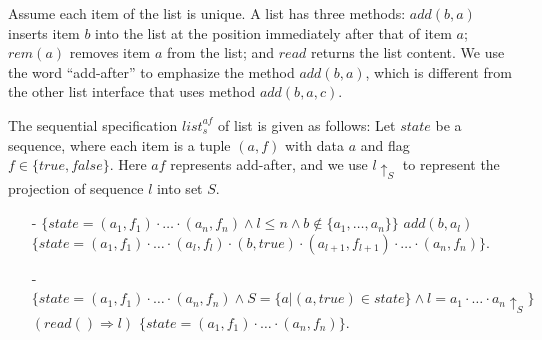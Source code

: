 \begin{example}
\label{definition:sequential specification of list with add-after interface}
Assume each item of the list is unique. A list has three methods: $\mathit{add}(b,a)$ inserts item $b$ into the list at the position immediately after that of item $a$; $\mathit{rem}(a)$ removes item $a$ from the list; and $\mathit{read}$ returns the list content. We use the word ``add-after'' to emphasize the method $\mathit{add}(b,a)$, which is different from the other list interface that uses method $\mathit{add}(b,a,c)$.

The sequential specification $\mathit{list}_s^{\mathit{af}}$ of list is given as follows: Let $\mathit{state}$ be a sequence, where each item is a tuple $(a,f)$ with data $a$ and flag $f \in \{ \mathit{true},\mathit{false} \}$. Here $\mathit{af}$ represents add-after, and we use $l \uparrow_{S}$ to represent the projection of sequence $l$ into set $S$.
\begin{itemize}
\setlength{\itemsep}{0.5pt}
\item[-] $\{ \mathit{state} = (a_1,f_1) \cdot \ldots \cdot (a_n,f_n) \wedge l \leq n \wedge b \notin \{ a_1, \ldots, a_n \} \}$ $add(b,a_l)$ $\{ \mathit{state} = (a_1,f_1) \cdot \ldots \cdot (a_l,f_l) \cdot (b,\mathit{true}) \cdot (a_{l+1},f_{l+1}) \cdot \ldots \cdot (a_n,f_n) \}$.
\item[-] $\{ \mathit{state} = (a_1,f_1) \cdot \ldots \cdot (a_n,f_n) \wedge S = \{ a \vert (a,\mathit{true}) \in \mathit{state} \} \wedge l = a_1 \cdot \ldots \cdot a_n \uparrow_{S} \}$ $(read() \Rightarrow l)$ $\{ \mathit{state} = (a_1,f_1) \cdot \ldots \cdot (a_n,f_n) \}$.
\end{itemize}
\end{example}



